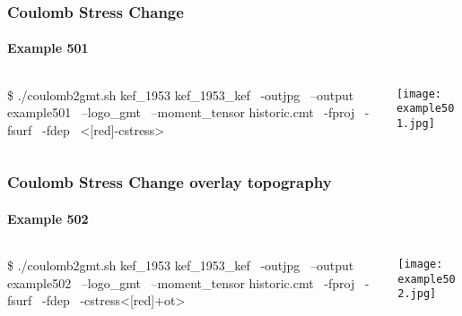 \begin{frame}[t,fragile]
  \frametitle{Coulomb Stress Change}
  \framesubtitle{Example 501}
  \label{ch5fr:ex501}
\begin{columns}[t]
  \begin{column}{.5\textwidth}
\begin{scriptsize}
\begin{verbnobox}[\vbdelim]
\$ ./coulomb2gmt.sh kef_1953 kef_1953_kef \
                   -outjpg \ 
                   --output example501 \
                   --logo_gmt \
                   --moment_tensor historic.cmt \
                   -fproj \
                   -fsurf \
                   -fdep \
                   <[red]-cstress>
\end{verbnobox}
\end{scriptsize}

  \end{column}
  \begin{column}{.5\textwidth}

\centering
  \texttt{[image: example501.jpg]}
  \end{column}
\end{columns}

\end{frame}
\note{}

\begin{frame}[t,fragile]
  \frametitle{Coulomb Stress Change overlay topography}
  \framesubtitle{Example 502}
  \label{ch5fr:ex502}
\begin{columns}[t]
  \begin{column}{.5\textwidth}
\begin{scriptsize}
\begin{verbnobox}[\vbdelim]
\$ ./coulomb2gmt.sh kef_1953 kef_1953_kef \
                   -outjpg \ 
                   --output example502 \
                   --logo_gmt \
                   --moment_tensor historic.cmt \
                   -fproj \
                   -fsurf \
                   -fdep \
                   -cstress<[red]+ot>
\end{verbnobox}
\end{scriptsize}

  \end{column}
  \begin{column}{.5\textwidth}

\centering
  \texttt{[image: example502.jpg]}
  \end{column}
\end{columns}

\end{frame}
\note{}

